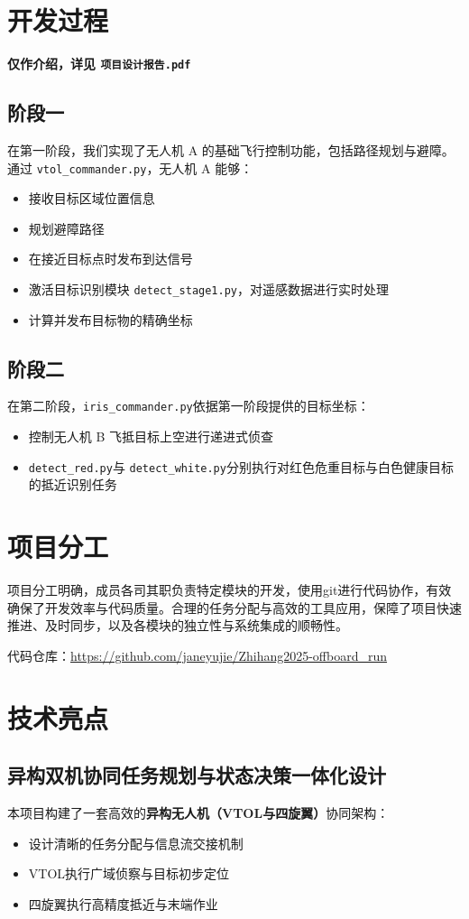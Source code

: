 \documentclass[12pt]{article}
\begin{document}
\section{开发过程}
\textbf{仅作介绍，详见 \texttt{项目设计报告.pdf}}

\subsection{阶段一}
在第一阶段，我们实现了无人机 A 的基础飞行控制功能，包括路径规划与避障。通过 \texttt{vtol\_commander.py}，无人机 A 能够：
\begin{itemize}
    \item 接收目标区域位置信息
    \item 规划避障路径
    \item 在接近目标点时发布到达信号
    \item 激活目标识别模块 \texttt{detect\_stage1.py}，对遥感数据进行实时处理
    \item 计算并发布目标物的精确坐标
\end{itemize}

\subsection{阶段二}
在第二阶段，\texttt{iris\_commander.py}依据第一阶段提供的目标坐标：
\begin{itemize}
    \item 控制无人机 B 飞抵目标上空进行递进式侦查
    \item \texttt{detect\_red.py}与 \texttt{detect\_white.py}分别执行对红色危重目标与白色健康目标的抵近识别任务
\end{itemize}

\section{项目分工}
项目分工明确，成员各司其职负责特定模块的开发，使用git进行代码协作，有效确保了开发效率与代码质量。合理的任务分配与高效的工具应用，保障了项目快速推进、及时同步，以及各模块的独立性与系统集成的顺畅性。

代码仓库：\url{https://github.com/janeyujie/Zhihang2025-offboard_run}

\section{技术亮点}
\subsection{异构双机协同任务规划与状态决策一体化设计}
本项目构建了一套高效的\textbf{异构无人机（VTOL与四旋翼）}协同架构：
\begin{itemize}
    \item 设计清晰的任务分配与信息流交接机制
    \item VTOL执行广域侦察与目标初步定位
    \item 四旋翼执行高精度抵近与末端作业
\end{itemize}
\end{document}
